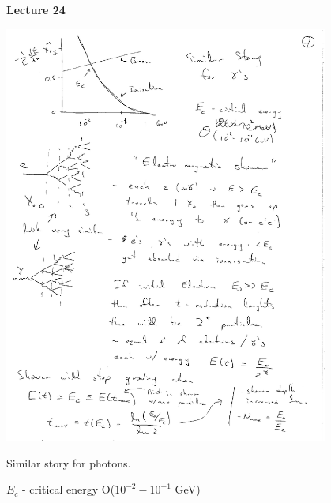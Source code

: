 
\usepackage{braket}
\usepackage{bbm}
\usepackage{relsize}
\usepackage{tcolorbox}




\usepackage{fancyhdr}

\fancyhf{}


\thispagestyle{fancy}

\begin{center}
{\huge \textbf{Lecture 24}}
\end{center}

{\fontsize{14}{16}\selectfont

\bc
\includegraphics[width=0.8\textwidth]{./DeDxRadiation.pdf}
\ec

Similar story for photons. 

$E_c$ - critical energy O($10^{-2} - 10^{-1}$ GeV)

}
